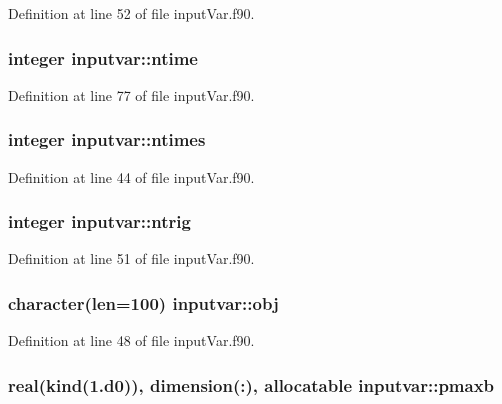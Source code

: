 Definition at line 52 of file input\-Var.\-f90.

\hypertarget{classinputvar_a30d8dd7bcf1952df019939f8ad23b6e2}{
\subsubsection[{ntime}]{\setlength{\rightskip}{0pt plus 5cm}integer inputvar\-::ntime}}\label{classinputvar_a30d8dd7bcf1952df019939f8ad23b6e2}


Definition at line 77 of file input\-Var.\-f90.

\hypertarget{classinputvar_a98d384e0347fb055110c18572dbdb522}{
\subsubsection[{ntimes}]{\setlength{\rightskip}{0pt plus 5cm}integer inputvar\-::ntimes}}\label{classinputvar_a98d384e0347fb055110c18572dbdb522}


Definition at line 44 of file input\-Var.\-f90.

\hypertarget{classinputvar_ae4403f5c5b16bf2cbd2b607a87e5ee9a}{
\subsubsection[{ntrig}]{\setlength{\rightskip}{0pt plus 5cm}integer inputvar\-::ntrig}}\label{classinputvar_ae4403f5c5b16bf2cbd2b607a87e5ee9a}


Definition at line 51 of file input\-Var.\-f90.

\hypertarget{classinputvar_ab5d2f467a214e31204c18a24582b81bb}{
\subsubsection[{obj}]{\setlength{\rightskip}{0pt plus 5cm}character(len=100) inputvar\-::obj}}\label{classinputvar_ab5d2f467a214e31204c18a24582b81bb}


Definition at line 48 of file input\-Var.\-f90.

\hypertarget{classinputvar_abe0141eabac694fc809b9b8f8bff28e7}{
\subsubsection[{pmaxb}]{\setlength{\rightskip}{0pt plus 5cm}real(kind(1.d0)), dimension(\-:), allocatable inputvar\-::pmaxb}}\label{classinputvar_abe0141eabac694fc809b9b8f8bff28e7}


